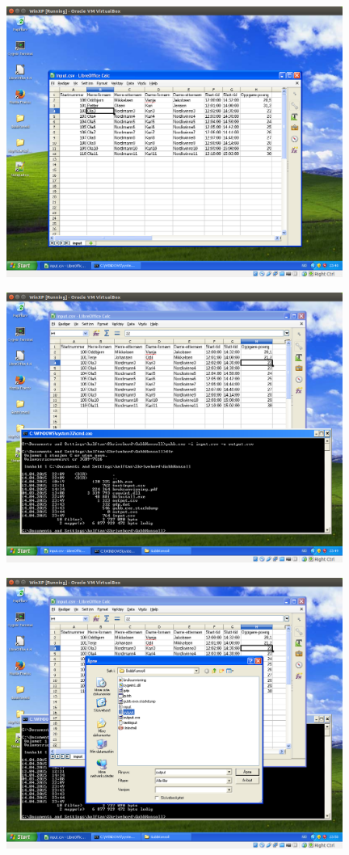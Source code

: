 \documentclass[12pt]{book}
\begin{document}
\includegraphics[width=11cm]{013}

\includegraphics[width=11cm]{014}

\includegraphics[width=11cm]{015}
\end{document}

